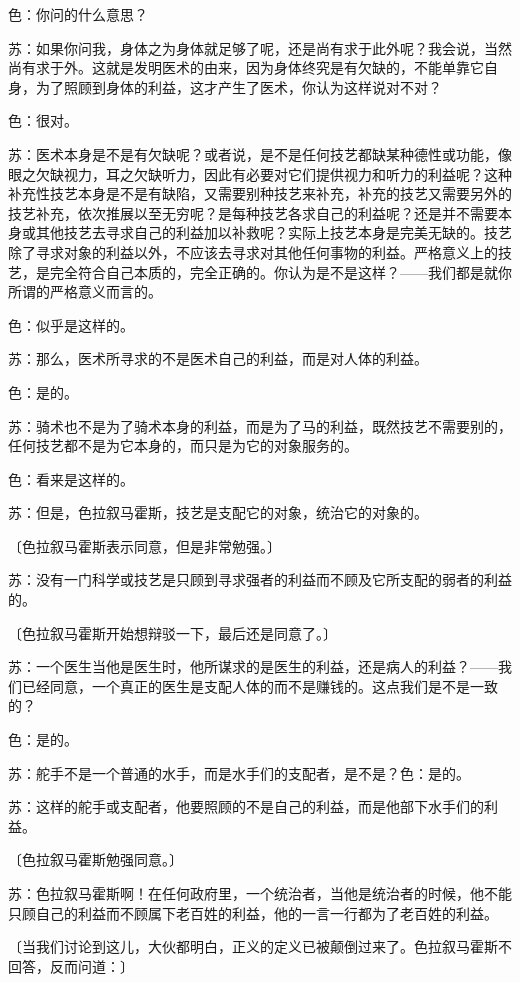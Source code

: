 \documentclass[12pt,oneside]{book}
\begin{document}
色：你问的什么意思？

苏：如果你问我，身体之为身体就足够了呢，还是尚有求于此外呢？我会说，当然尚有求于外。这就是发明医术的由来，因为身体终究是有欠缺的，不能单靠它自身，为了照顾到身体的利益，这才产生了医术，你认为这样说对不对？

色：很对。

苏：医术本身是不是有欠缺呢？或者说，是不是任何技艺都缺某种德性或功能，像眼之欠缺视力，耳之欠缺听力，因此有必要对它们提供视力和听力的利益呢？这种补充性技艺本身是不是有缺陷，又需要别种技艺来补充，补充的技艺又需要另外的技艺补充，依次推展以至无穷呢？是每种技艺各求自己的利益呢？还是并不需要本身或其他技艺去寻求自己的利益加以补救呢？实际上技艺本身是完美无缺的。技艺除了寻求对象的利益以外，不应该去寻求对其他任何事物的利益。严格意义上的技艺，是完全符合自己本质的，完全正确的。你认为是不是这样？——我们都是就你所谓的严格意义而言的。

色：似乎是这样的。

苏：那么，医术所寻求的不是医术自己的利益，而是对人体的利益。

色：是的。

苏：骑术也不是为了骑术本身的利益，而是为了马的利益，既然技艺不需要别的，任何技艺都不是为它本身的，而只是为它的对象服务的。

色：看来是这样的。

苏：但是，色拉叙马霍斯，技艺是支配它的对象，统治它的对象的。

〔色拉叙马霍斯表示同意，但是非常勉强。〕

苏：没有一门科学或技艺是只顾到寻求强者的利益而不顾及它所支配的弱者的利益的。

〔色拉叙马霍斯开始想辩驳一下，最后还是同意了。〕

苏：一个医生当他是医生时，他所谋求的是医生的利益，还是病人的利益？——我们已经同意，一个真正的医生是支配人体的而不是赚钱的。这点我们是不是一致的？

色：是的。

苏：舵手不是一个普通的水手，而是水手们的支配者，是不是？色：是的。

苏：这样的舵手或支配者，他要照顾的不是自己的利益，而是他部下水手们的利益。

〔色拉叙马霍斯勉强同意。〕

苏：色拉叙马霍斯啊！在任何政府里，一个统治者，当他是统治者的时候，他不能只顾自己的利益而不顾属下老百姓的利益，他的一言一行都为了老百姓的利益。

〔当我们讨论到这儿，大伙都明白，正义的定义已被颠倒过来了。色拉叙马霍斯不回答，反而问道：〕
\end{document}
